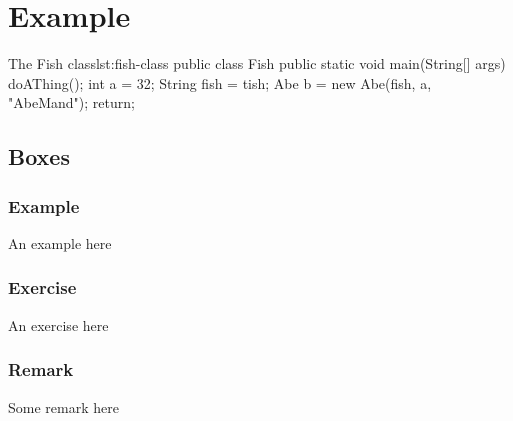 \chapter{Example}
\blindtext
{}



\begin{JavaCode}{The Fish class}{lst:fish-class}
	public class Fish {
		public static void main(String[] args) {
			doAThing();
			int a = 32;
			String fish = tish;
			Abe b = new Abe(fish, a, "AbeMand");
			return;
		}
	}
\end{JavaCode}

\blindtext

\section{Boxes}

\subsection{Example}
\begin{example}
	An example here
\end{example}

\subsection{Exercise}
\begin{exercise}
	An exercise here
\end{exercise}

\subsection{Remark}
\begin{remark}
	Some remark here
\end{remark}